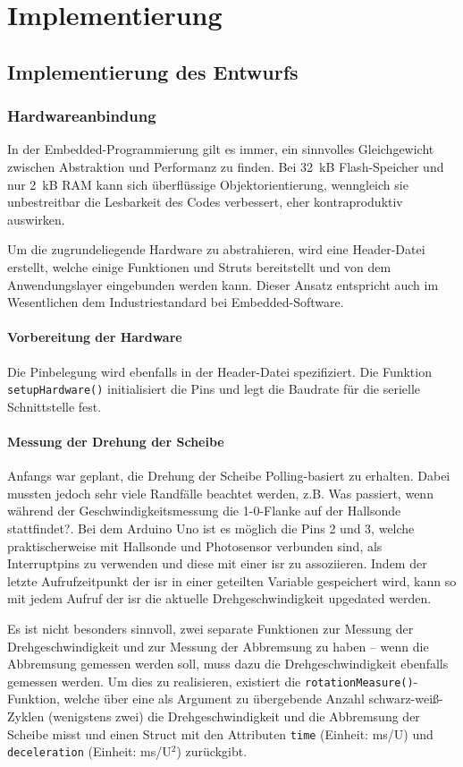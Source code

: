 \documentclass{kis}
\begin{document}
\section{Implementierung}

\subsection{Implementierung des Entwurfs}
\subsubsection{Hardwareanbindung}
In der Embedded-Programmierung gilt es immer, ein sinnvolles Gleichgewicht zwischen Abstraktion und Performanz zu finden. Bei 32~kB Flash-Speicher und nur 2~kB RAM kann sich überflüssige Objektorientierung, wenngleich sie unbestreitbar die Lesbarkeit des Codes verbessert, eher kontraproduktiv auswirken.

Um die zugrundeliegende Hardware zu abstrahieren, wird eine Header-Datei erstellt, welche einige Funktionen und Struts bereitstellt und von dem Anwendungslayer eingebunden werden kann. Dieser Ansatz entspricht auch im Wesentlichen dem Industriestandard bei Embedded-Software.

\paragraph{Vorbereitung der Hardware}
Die Pinbelegung wird ebenfalls in der Header-Datei spezifiziert. Die Funktion \texttt{setupHardware()} initialisiert die Pins und legt die Baudrate für die serielle Schnittstelle fest.

\paragraph{Messung der Drehung der Scheibe}
Anfangs war geplant, die Drehung der Scheibe Polling-basiert zu erhalten. Dabei mussten jedoch sehr viele Randfälle beachtet werden, z.B. \glqq{}Was passiert, wenn während der Geschwindigkeitsmessung die 1-0-Flanke auf der Hallsonde stattfindet?\grqq{}. Bei dem Arduino Uno ist es möglich die Pins 2 und 3, welche praktischerweise mit Hallsonde und Photosensor verbunden sind, als Interruptpins zu verwenden und diese mit einer \gls{isr} zu assoziieren. Indem der letzte Aufrufzeitpunkt der \gls{isr} in einer geteilten Variable gespeichert wird, kann so mit jedem Aufruf der \gls{isr} die aktuelle Drehgeschwindigkeit upgedated werden. 

\iffalse
Es ist nicht besonders sinnvoll, zwei separate Funktionen zur Messung der Drehgeschwindigkeit und zur Messung der Abbremsung zu haben -- wenn die Abbremsung gemessen werden soll, muss dazu die Drehgeschwindigkeit ebenfalls gemessen werden. Um dies zu realisieren, existiert die \texttt{rotationMeasure()}-Funktion, welche über eine als Argument zu übergebende Anzahl schwarz-weiß-Zyklen (wenigstens zwei) die Drehgeschwindigkeit und die Abbremsung der Scheibe misst und einen Struct mit den Attributen \texttt{time} (Einheit: ms/U) und \texttt{deceleration} (Einheit: ms/U$^2$) zurückgibt.
\end{document}
